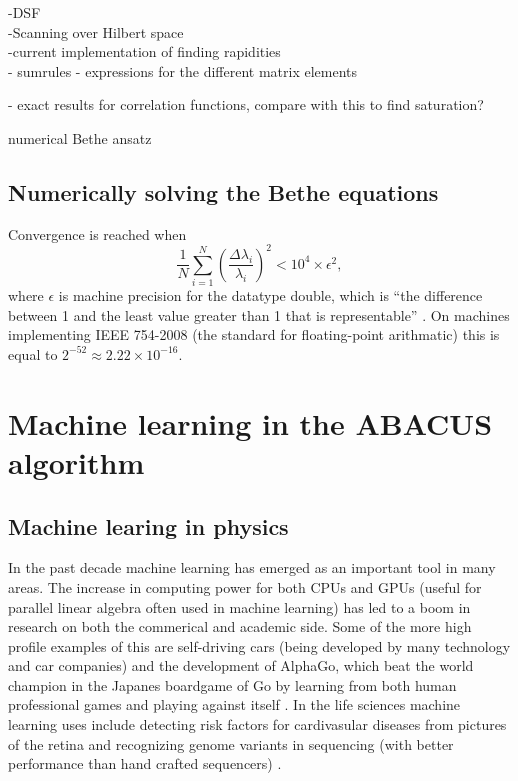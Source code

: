 \documentclass[11pt, a4paper,draft]{report} %
\begin{document}
-DSF\\
-Scanning over Hilbert space\\
-current implementation of finding rapidities\\
- sumrules
- expressions for the different matrix elements

- exact results for correlation functions\cite{Lang2017}, compare with this to find saturation?

numerical Bethe ansatz \cite{Gu2005}
\section{Numerically solving the Bethe equations}

Convergence is reached when \cite{Caux2009}
\begin{equation}
	\frac{1}{N}\sum_{i=1}^{N} \left(\frac{\Delta \lambda_i}{\lambda_i}\right)^2 < 10^4 \times \epsilon^2,
\end{equation}
where \(\epsilon\) is machine precision for the datatype double, which is ``the difference between 1 and the least value greater than 1 that is representable'' \cite{cppstandard2016}.
On machines implementing IEEE 754-2008 (the standard for floating-point arithmatic) \cite{ieeefp2008} this is equal to \({2^{-52} \approx 2.22 \times 10^{-16}}\).


\chapter{Machine learning in the ABACUS algorithm}

\section{Machine learing in physics}

In the past decade machine learning has emerged as an important tool in many areas.
The increase in computing power for both CPUs and GPUs (useful for parallel linear algebra often used in machine learning) has led to a boom in research on both the commerical and academic side.
Some of the more high profile examples of this are self-driving cars (being developed by many technology and car companies)  and the development of AlphaGo, which beat the world champion in the Japanes boardgame of Go by learning from both human professional games and playing against itself \cite{Silver2017a,Silver2017}.
In the life sciences machine learning uses include detecting risk factors for cardivasular diseases from pictures of the retina \cite{poplin17_predic_cardiov_risk_factor_from} and recognizing genome variants in sequencing (with better performance than hand crafted sequencers) \cite{Poplin2016}.
\end{document}
